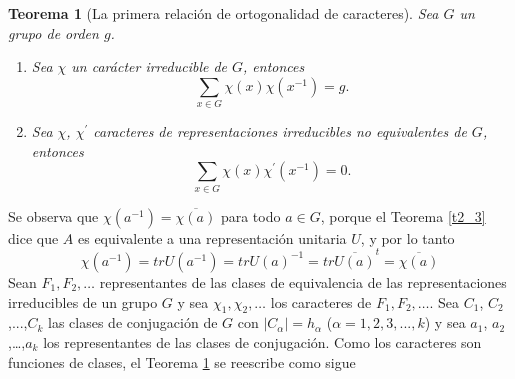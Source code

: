 \documentclass[12pt]{book}
\newtheorem{theorem}{Teorema}[section]
\theoremstyle{definition}
\newcounter{in}
\begin{document}
\begin{theorem}[La primera relación de ortogonalidad de caracteres]
  \label{t4_4}
  Sea $G$ un grupo de orden $g$.
  \begin{enumerate}
  \item Sea $\chi$ un carácter irreducible de $G$, entonces 
  \begin{equation*}
    \sum_{x \in G} \chi(x) \chi(x^{-1}) = g.
  \end{equation*}
  \item Sea $\chi$, $\chi^{'}$ caracteres de representaciones
    irreducibles no equivalentes de $G$, entonces
  \begin{equation*}
    \sum_{x \in G} \chi(x) \chi^{'}(x^{-1}) = 0.
  \end{equation*}
  \end{enumerate}
\end{theorem}
Se observa que $\chi(a^{-1})=\overline{\chi(a)}$ para todo $a \in G$,
porque el Teorema \ref{t2_3} dice que $A$ es equivalente a una
representación unitaria $U$, y por lo tanto
\begin{equation}
  \label{eq:34}
  \chi(a^{-1})=trU(a^{-1})=trU(a)^{-1}=tr \overline{U(a)}^{t} = \overline{\chi(a)}  
\end{equation}
Sean $F_{1}, F_{2}, \ldots$ representantes de las clases de
equivalencia de las representaciones irreducibles de un grupo $G$ y
sea $\chi_{1}, \chi_{2}, \ldots $ los caracteres de
$F_{1}, F_{2}, \ldots$.  Sea $C_{1}$, $C_{2}$,...,$C_{k}$ las clases
de conjugación de $G$ con $|C_{\alpha}|=h_{\alpha}$
($\alpha=1, 2, 3,...,k$) y sea $a_{1}$, $a_{2}$,\ldots,$a_{k}$ los
representantes de las clases de conjugación. Como los caracteres son
funciones de clases, el Teorema \ref{t4_4} se reescribe como sigue
\end{document}

